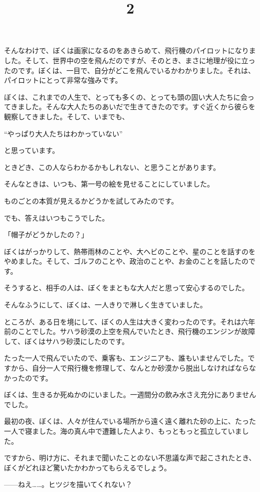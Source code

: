そんなわけで、ぼくは画家になるのをあきらめて、飛行機のパイロットになりました。そして、世界中の空を飛んだのですが、そのとき、まさに地理が役に立ったのです。ぼくは、一目で、自分がどこを飛んでいるかわかりました。それは、パイロットにとって非常な強みです。

ぼくは、これまでの人生で、とっても多くの、とっても頭の固い大人たちに会ってきました。そんな大人たちのあいだで生きてきたのです。すぐ近くから彼らを観察してきました。そして、いまでも、

“やっぱり大人たちはわかっていない”

と思っています。

ときどき、この人ならわかるかもしれない、と思うことがあります。

そんなときは、いつも、第一号の絵を見せることにしていました。

ものごとの本質が見えるかどうかを試してみたのです。

でも、答えはいつもこうでした。

「帽子がどうかしたの？」

ぼくはがっかりして、熱帯雨林のことや、大ヘビのことや、星のことを話すのをやめました。そして、ゴルフのことや、政治のことや、お金のことを話したのです。

そうすると、相手の人は、ぼくをまともな大人だと思って安心するのでした。

\title{2}

そんなふうにして、ぼくは、一人きりで淋しく生きていました。

ところが、ある日を境にして、ぼくの人生は大きく変わったのです。それは六年前のことでした。サハラ砂漠の上空を飛んでいたとき、飛行機のエンジンが故障して、ぼくはサハラ砂漠にしたのです。


たった一人で飛んでいたので、乗客も、エンジニアも、誰もいませんでした。ですから、自分一人で飛行機を修理して、なんとか砂漠から脱出しなければならなかったのです。

ぼくは、生きるか死ぬかのにいました。一週間分の飲み水さえ充分にありませんでした。

最初の夜、ぼくは、人々が住んでいる場所から遠く遠く離れた砂の上に、たった一人で寝ました。海の真ん中で遭難した人より、もっともっと孤立していました。

ですから、明け方に、それまで聞いたことのない不思議な声で起こされたとき、ぼくがどれほど驚いたかわかってもらえるでしょう。

——ねえ……。ヒツジを描いてくれない？


